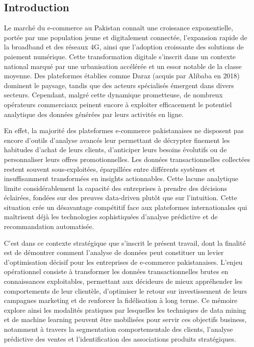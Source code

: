 \documentclass[a4paper,12pt]{article}
\begin{document}
\begin{center}
\chapter*{Introduction}
\end{center}

Le marché du e-commerce au Pakistan connaît une croissance exponentielle, portée par une population jeune et digitalement connectée, l'expansion rapide de la broadband et des réseaux 4G, ainsi que l'adoption croissante des solutions de paiement numérique. Cette transformation digitale s'inscrit dans un contexte national marqué par une urbanisation accélérée et un essor notable de la classe moyenne. Des plateformes établies comme Daraz (acquis par Alibaba en 2018) dominent le paysage, tandis que des acteurs spécialisés émergent dans divers secteurs. Cependant, malgré cette dynamique prometteuse, de nombreux opérateurs commerciaux peinent encore à exploiter efficacement le potentiel analytique des données générées par leurs activités en ligne.

En effet, la majorité des plateformes e-commerce pakistanaises ne disposent pas encore d'outils d'analyse avancés leur permettant de décrypter finement les habitudes d'achat de leurs clients, d'anticiper leurs besoins évolutifs ou de personnaliser leurs offres promotionnelles. Les données transactionnelles collectées restent souvent sous-exploitées, éparpillées entre différents systèmes et insuffisamment transformées en insights actionnables. Cette lacune analytique limite considérablement la capacité des entreprises à prendre des décisions éclairées, fondées sur des preuves data-driven plutôt que sur l'intuition. Cette situation crée un désavantage compétitif face aux plateformes internationales qui maîtrisent déjà les technologies sophistiquées d'analyse prédictive et de recommandation automatisée.

C'est dans ce contexte stratégique que s'inscrit le présent travail, dont la finalité est de démontrer comment l'analyse de données peut constituer un levier d'optimisation décisif pour les entreprises de e-commerce pakistanaises. L'enjeu opérationnel consiste à transformer les données transactionnelles brutes en connaissances exploitables, permettant aux décideurs de mieux appréhender les comportements de leur clientèle, d'optimiser le retour sur investissement de leurs campagnes marketing et de renforcer la fidélisation à long terme. Ce mémoire explore ainsi les modalités pratiques par lesquelles les techniques de data mining et de machine learning peuvent être mobilisées pour servir ces objectifs business, notamment à travers la segmentation comportementale des clients, l'analyse prédictive des ventes et l'identification des associations produits stratégiques.
\end{document}
